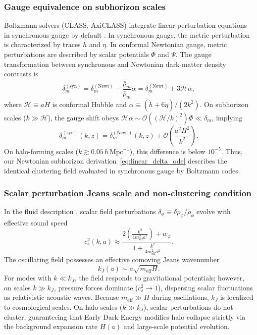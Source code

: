 \documentclass[11pt]{article}
\newcommand{\Mpc}{\mathrm{Mpc}}
\begin{document}
\subsubsection{Gauge equivalence on subhorizon scales}
Boltzmann solvers ($\text{CLASS}$, $\text{AxiCLASS}$) integrate linear perturbation equations in synchronous gauge by default \cite{ma1995perturbations,lesgourgues2011class1}. In synchronous gauge, the metric perturbation is characterized by traces $h$ and $\eta$. In conformal Newtonian gauge, metric perturbations are described by scalar potentials $\Phi$ and $\Psi$. The gauge transformation between synchronous and Newtonian dark-matter density contrasts is \cite{ma1995perturbations}
\begin{equation}
\delta_m^{(\mathrm{syn})} = \delta_m^{(\mathrm{Newt})} - \frac{\dot{\bar\rho}_m}{\bar\rho_m}\alpha = \delta_m^{(\mathrm{Newt})} + 3\mathcal H\alpha,
\end{equation}
where $\mathcal H \equiv aH$ is conformal Hubble and $\alpha \equiv (\dot h + 6\dot\eta)/(2k^2)$. On subhorizon scales ($k \gg \mathcal H$), the gauge shift obeys $\mathcal H\alpha \sim \mathcal O\left((\mathcal H/k)^2\right)\Phi \ll \delta_m$, implying
\begin{equation}
\delta_m^{(\mathrm{syn})}(k, z) = \delta_m^{(\mathrm{Newt})}(k, z) + \mathcal O\left( \frac{a^2H^2}{k^2} \right).
\end{equation}
On halo-forming scales ($k \gtrsim 0.05\,h\,\Mpc^{-1}$), this difference is below $10^{-5}$. Thus, our Newtonian subhorizon derivation~\eqref{eq:linear_delta_ode} describes the identical clustering field evaluated in synchronous gauge by Boltzmann codes.

\subsubsection{Scalar perturbation Jeans scale and non-clustering condition}
In the fluid description \cite{smith2020oscillating}, scalar field perturbations $\delta_\phi \equiv \delta\rho_\phi / \bar\rho_\phi$ evolve with effective sound speed
\begin{equation}
c_s^2(k, a) \approx \frac{2\left(\frac{k^2}{4m_{\mathrm{eff}}^2 a^2}\right) + w_\phi}{1 + \frac{k^2}{4m_{\mathrm{eff}}^2 a^2}}.
\end{equation}
The oscillating field possesses an effective comoving Jeans wavenumber
\begin{equation}
k_J(a) \sim a \sqrt{m_{\mathrm{eff}} H}.
\end{equation}
For modes with $k \ll k_J$, the field responds to gravitational potentials; however, on scales $k \gg k_J$, pressure forces dominate ($c_s^2 \to 1$), dispersing scalar fluctuations as relativistic acoustic waves. Because $m_{\mathrm{eff}} \gg H$ during oscillations, $k_J$ is localized to cosmological scales. On halo scales ($k \gg k_J$), scalar perturbations do not cluster, guaranteeing that Early Dark Energy modifies halo collapse strictly via the background expansion rate $H(a)$ and large-scale potential evolution.
\end{document}
